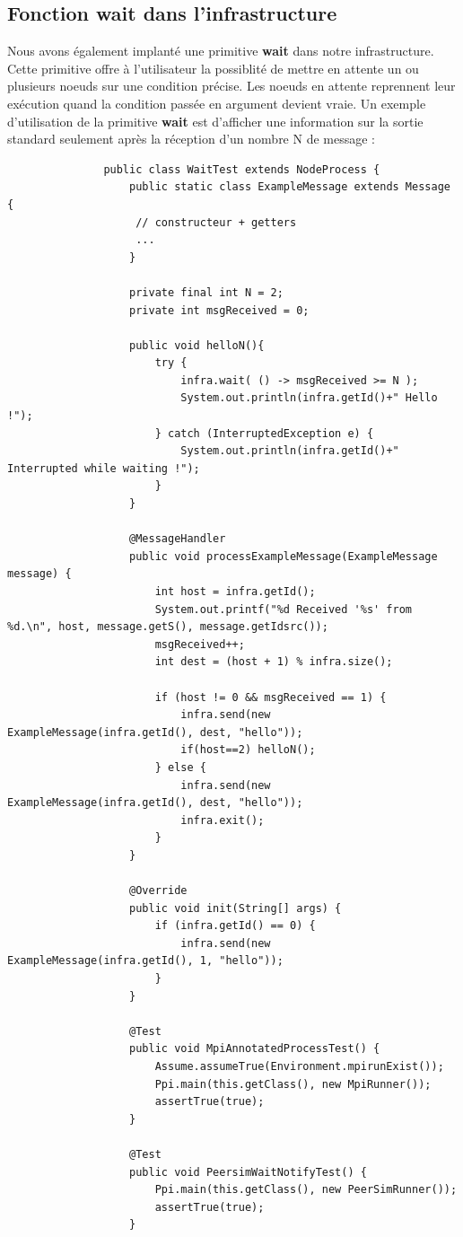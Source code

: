 \documentclass{article}
\begin{document}
			\subsection{Fonction wait dans l'infrastructure}	
			Nous avons également implanté une primitive \textbf{wait} dans notre infrastructure. Cette primitive offre à l'utilisateur la possiblité de mettre en attente un ou plusieurs noeuds sur une condition précise.
			Les noeuds en attente reprennent leur exécution quand la condition passée en argument devient vraie.
			\newline
			\newline
			Un exemple d'utilisation de la primitive \textbf{wait} est d'afficher une information sur la sortie standard seulement
			après la réception d'un nombre N de message :
			\newpage
			\begin{lstlisting}
			   public class WaitTest extends NodeProcess {
				   public static class ExampleMessage extends Message {
					// constructeur + getters
					...
				   }
				   
				   private final int N = 2;
				   private int msgReceived = 0;
						   
				   public void helloN(){
					   try {
						   infra.wait( () -> msgReceived >= N );
						   System.out.println(infra.getId()+" Hello !");
					   } catch (InterruptedException e) {
						   System.out.println(infra.getId()+" Interrupted while waiting !");
					   }
				   }
				   
				   @MessageHandler
				   public void processExampleMessage(ExampleMessage message) {
					   int host = infra.getId();
					   System.out.printf("%d Received '%s' from %d.\n", host, message.getS(), message.getIdsrc());
					   msgReceived++;
					   int dest = (host + 1) % infra.size();
					   
					   if (host != 0 && msgReceived == 1) {
						   infra.send(new ExampleMessage(infra.getId(), dest, "hello"));
						   if(host==2) helloN();
					   } else {
						   infra.send(new ExampleMessage(infra.getId(), dest, "hello"));
						   infra.exit();
					   }
				   }
			   
				   @Override
				   public void init(String[] args) {
					   if (infra.getId() == 0) {
						   infra.send(new ExampleMessage(infra.getId(), 1, "hello"));
					   }
				   }
			   
				   @Test
				   public void MpiAnnotatedProcessTest() {
					   Assume.assumeTrue(Environment.mpirunExist());
					   Ppi.main(this.getClass(), new MpiRunner());
					   assertTrue(true);
				   }
			   
				   @Test
				   public void PeersimWaitNotifyTest() {
					   Ppi.main(this.getClass(), new PeerSimRunner());
					   assertTrue(true);
				   }
			\end{lstlisting}
			
\end{document}
